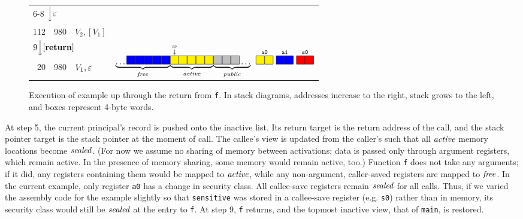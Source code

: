 \documentclass[10pt,conference]{ieeetran}%
\theoremstyle{definition}
\begin{document}
\begin{figure*}
\begin{tabular}{|r|r||l|r}
    \cline{1-3}
    \multicolumn{3}{l}{\multirow{2}{*}{6-8 \(\Big\downarrow \varepsilon\)}} \\ \multicolumn{3}{l}{} \\
    \cline{1-3}
    112 & 980 & \(V_2,[V_1]\) \\
    \cline{1-3}
    \multicolumn{3}{l}{\multirow{2}{*}{\(9 \Big\downarrow [\mathbf{return}]\)}} & \\
    \multicolumn{3}{l}{} & \multirow{3}{*}{\(\underbrace{\dots \freebox \freebox \freebox \freebox \freebox}_\unsealed
      \! \underbrace{\stackrel{\stackrel{\SP}{\downarrow}}{\objbox} \!\! \objbox \objbox \objbox \objbox}_\object
      \! \underbrace{\pubbox \pubbox \pubbox \dots}_\public
      ~ \stackrel{\mathtt{a0}}{\objbox\objbox} ~ \stackrel{\mathtt{a1}}{\freebox\freebox}
      ~ \stackrel{\mathtt{s0}}{\sealbox\sealbox}
      \)}
    \\
    \cline{1-3}
    20 & 980  & \(V_1, \varepsilon\) &
    \\
    \cline{1-3}
    \multicolumn{2}{l}{} \\
  \end{tabular}
  \caption{Execution of example up through the return from {\tt f}. In stack diagrams, addresses increase to the right, stack grows to the left, and boxes represent 4-byte words.}
\label{fig:exec1}
\end{figure*}
%
At step 5, the current principal's record is pushed onto the inactive list.
Its return target is the return address of the call,
and the stack pointer target is the stack pointer at the moment of call.
The callee's view is updated from the caller's such that all \(\mathit{active}\) memory locations
become \(\mathit{sealed}\). (For now we assume no sharing of memory between activations; data is
passed only through argument registers, which remain active. In the presence of memory
sharing, some memory would remain active, too.)
Function {\tt f} does not take any arguments; if it did, any registers containing them would be
mapped to \(\mathit{active}\), while any non-argument, caller-saved
registers are mapped to \(\mathit{free}\). In the current example, only register {\tt a0} has a change in
security class. All callee-save registers remain \(\mathit{sealed}\) for all calls.
Thus, if we varied the assembly code for the example slightly so that {\tt sensitive} was stored
in a callee-save register (e.g. {\tt s0}) rather than in memory, its security class would still be \(\mathit{sealed}\)
at the entry to {\tt f}.
%
At step 9, {\tt f} returns, and the topmost inactive view, that of {\tt main}, is restored.
\end{document}
